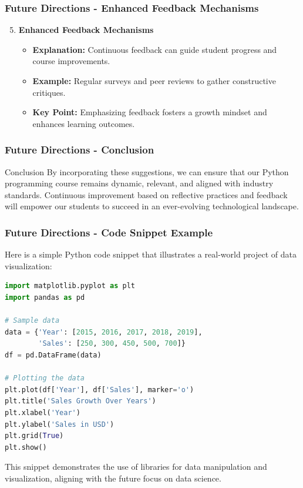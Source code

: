 \documentclass{beamer}
\begin{document}
\begin{frame}[fragile]
    \frametitle{Future Directions - Enhanced Feedback Mechanisms}
    \begin{enumerate}
        \setcounter{enumi}{4}
        \item \textbf{Enhanced Feedback Mechanisms}
        \begin{itemize}
            \item \textbf{Explanation:} Continuous feedback can guide student progress and course improvements.
            \item \textbf{Example:} Regular surveys and peer reviews to gather constructive critiques.
            \item \textbf{Key Point:} Emphasizing feedback fosters a growth mindset and enhances learning outcomes.
        \end{itemize}
    \end{enumerate}
\end{frame}

\begin{frame}[fragile]
    \frametitle{Future Directions - Conclusion}
    \begin{block}{Conclusion}
        By incorporating these suggestions, we can ensure that our Python programming course remains dynamic, relevant, and aligned with industry standards. Continuous improvement based on reflective practices and feedback will empower our students to succeed in an ever-evolving technological landscape.
    \end{block}
\end{frame}

\begin{frame}[fragile]
    \frametitle{Future Directions - Code Snippet Example}
    Here is a simple Python code snippet that illustrates a real-world project of data visualization:
    \begin{lstlisting}[language=Python]
import matplotlib.pyplot as plt
import pandas as pd

# Sample data
data = {'Year': [2015, 2016, 2017, 2018, 2019],
        'Sales': [250, 300, 450, 500, 700]}
df = pd.DataFrame(data)

# Plotting the data
plt.plot(df['Year'], df['Sales'], marker='o')
plt.title('Sales Growth Over Years')
plt.xlabel('Year')
plt.ylabel('Sales in USD')
plt.grid(True)
plt.show()
    \end{lstlisting}

    This snippet demonstrates the use of libraries for data manipulation and visualization, aligning with the future focus on data science.
\end{frame}
\end{document}
